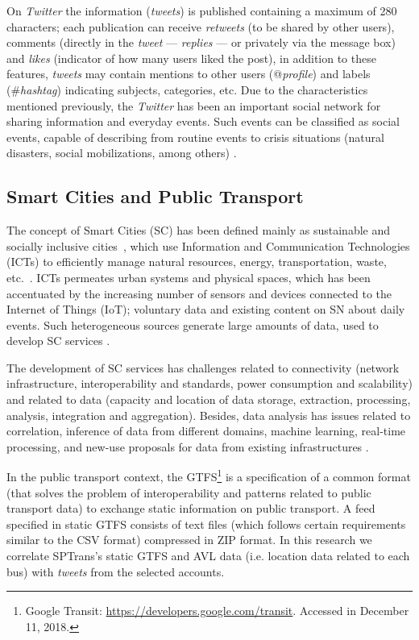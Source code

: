 \documentclass[runningheads]{llncs}
\begin{document}
On \textit{Twitter} the information (\textit{tweets}) is published containing a maximum of 280 characters; each publication can receive \textit {retweets} (to be shared by other users), comments (directly in the \textit{tweet} --- \textit {replies} --- or privately via the message box) and \textit{likes} (indicator of how many users liked the post), in addition to these features, \textit{tweets} may contain mentions to other users (@\textit{profile}) and labels (\#\textit{hashtag}) indicating subjects, categories, etc. Due to the characteristics mentioned previously, the \textit {Twitter} has been an important social network for sharing information and everyday events. Such events can be classified as social events, capable of describing from routine events to crisis situations (natural disasters, social mobilizations, among others) \cite{zhou2014event, atefeh2015survey}.

\subsection{Smart Cities and Public Transport}
\label{smartCities}

The concept of Smart Cities (SC) has been defined mainly as sustainable and socially inclusive cities~\cite{Wang2017}, which use Information and Communication Technologies (ICTs) to efficiently manage natural resources, energy, transportation, waste, etc.~\cite{Ahvenniemi2017}. ICTs permeates urban systems and physical spaces, which has been accentuated by the increasing number of sensors and devices connected to the Internet of Things (IoT); voluntary data and existing content on SN about daily events. Such heterogeneous sources generate large amounts of data, used to develop SC services \cite{Finger2017, Ang2017}.

The development of SC services has challenges related to connectivity (network infrastructure, interoperability and standards, power consumption and scalability) and related to data (capacity and location of data storage, extraction, processing, analysis, integration and aggregation). Besides, data analysis has issues related to correlation, inference of data from different domains, machine learning, real-time processing, and new-use proposals for data from existing infrastructures \cite{Ang2017, Xiao2017}.

In the public transport context, the GTFS\footnote{\label{googleTransit}Google Transit: \url{https://developers.google.com/transit}. Accessed in December 11, 2018.} is a specification of a common format (that solves the problem of interoperability and patterns related to public transport data) to exchange static information on public transport. A feed specified in static GTFS consists of text files (which follows certain requirements similar to the CSV format) compressed in ZIP format. In this research we correlate SPTrans's static GTFS and AVL data (i.e. location data related to each bus) with \textit{tweets} from the selected accounts.
\end{document}
